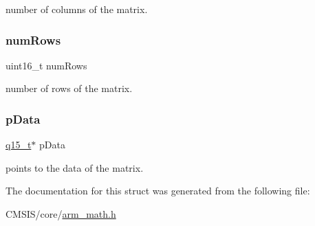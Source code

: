 number of columns of the matrix. \mbox{\label{structarm__matrix__instance__q15_a1bcf80ccdc2acc29198f1592ae300390}} 
\subsubsection{\texorpdfstring{numRows}{numRows}}
{\footnotesize\ttfamily uint16\+\_\+t num\+Rows}

number of rows of the matrix. \mbox{\label{structarm__matrix__instance__q15_a817ede38365e63e561a12069c6c5c087}} 
\subsubsection{\texorpdfstring{pData}{pData}}
{\footnotesize\ttfamily \mbox{\hyperlink{arm__math_8h_ab5a8fb21a5b3b983d5f54f31614052ea}{q15\+\_\+t}}$\ast$ p\+Data}

points to the data of the matrix. 

The documentation for this struct was generated from the following file\+:\begin{DoxyCompactItemize}
\item 
C\+M\+S\+I\+S/core/\mbox{\hyperlink{arm__math_8h}{arm\+\_\+math.\+h}}\end{DoxyCompactItemize}
